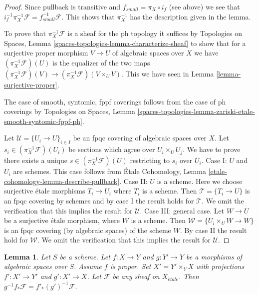 \documentclass{stacks-project}
\theoremstyle{plain}
\newtheorem{lemma}[subsection]{Lemma}
\theoremstyle{definition}
\theoremstyle{remark}
\numberwithin{equation}{subsection}
\def\etale{{\acute{e}tale}}
\begin{document}
\begin{proof}
Since pullback is transitive and $f_{small} = \pi_X \circ i_f$
(see above) we see that
$i_f^{-1} \pi_X^{-1}\mathcal{F} = f_{small}^{-1}\mathcal{F}$.
This shows that $\pi_X^{-1}$ has the description given in the lemma.

\medskip\noindent
To prove that $\pi_X^{-1}\mathcal{F}$ is a sheaf for the ph topology
it suffices by Topologies on Spaces, Lemma
\ref{spaces-topologies-lemma-characterize-sheaf}
to show that for a surjective proper morphism
$V \to U$ of algebraic spaces over $X$ we have
$(\pi_X^{-1}\mathcal{F})(U)$ is the equalizer of the two maps
$(\pi_X^{-1}\mathcal{F})(V) \to (\pi_X^{-1}\mathcal{F})(V \times_U V)$.
This we have seen in Lemma \ref{lemma-surjective-proper}.

\medskip\noindent
The case of smooth, syntomic, fppf coverings follows from the case
of ph coverings by Topologies on Spaces, Lemma
\ref{spaces-topologies-lemma-zariski-etale-smooth-syntomic-fppf-ph}.

\medskip\noindent
Let $\mathcal{U} = \{U_i \to U\}_{i \in I}$ be an fpqc covering of algebraic
spaces over $X$. Let $s_i \in (\pi_X^{-1}\mathcal{F})(U_i)$ be sections
which agree over $U_i \times_U U_j$. We have to prove there exists a unique
$s \in (\pi_X^{-1}\mathcal{F})(U)$ restricting to $s_i$ over $U_i$.
Case I: $U$ and $U_i$ are schemes. This case follows from
\'Etale Cohomology, Lemma \ref{etale-cohomology-lemma-describe-pullback}.
Case II: $U$ is a scheme. Here we choose surjective \'etale morphisms
$T_i \to U_i$ where $T_i$ is a scheme. Then $\mathcal{T} = \{T_i \to U\}$ is an
fpqc covering by schemes and by case I the result holds for $\mathcal{T}$.
We omit the verification that this implies the result for $\mathcal{U}$.
Case III: general case. Let $W \to U$ be a surjective \'etale
morphism, where $W$ is a scheme. Then $\mathcal{W} = \{U_i \times_U W \to W\}$
is an fpqc covering (by algebraic spaces) of the scheme $W$.
By case II the result hold for $\mathcal{W}$.
We omit the verification that this implies the result for $\mathcal{U}$.
\end{proof}

\begin{lemma}
\label{lemma-proper-base-change-f-star}
Let $S$ be a scheme. Let $f : X \to Y$ and $g : Y' \to Y$
be a morphisms of algebraic spaces over $S$. Assume $f$ is proper.
Set $X' = Y' \times_Y X$ with projections $f' : X' \to Y'$ and $g' : X' \to X$.
Let $\mathcal{F}$ be any sheaf on $X_\etale$. Then
$g^{-1}f_*\mathcal{F} = f'_*(g')^{-1}\mathcal{F}$.
\end{lemma}
\end{document}
